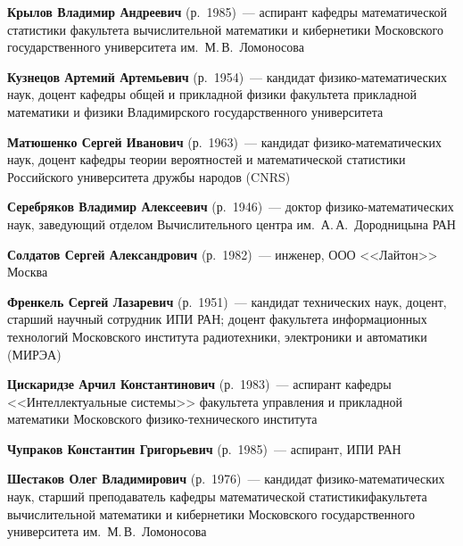 \begin{multicols}{2}
\vspace*{3pt}

\noindent
\textbf{Крылов Владимир Андреевич} (р.\ 1985)~--- аспирант кафедры математической 
статистики факультета вычислительной математики и кибернетики 
Московского государственного университета им.\ М.\,В.~Ломоносова

\columnbreak %


\noindent
\textbf{Кузнецов Артемий Артемьевич} (р.\ 1954)~--- кандидат физико-математических наук, доцент 
кафедры общей и прикладной физики факультета прикладной математики и физики  Владимирского государственного 
университета

\vspace*{3pt}

\noindent
\textbf{Матюшенко Сергей Иванович} (р.\ 1963)~--- кандидат физико-математических наук, 
доцент кафедры тео\-рии вероятностей и математической статистики Российского университета дружбы народов
(CNRS)

\vspace*{3pt}

\noindent
\textbf{Серебряков Владимир Алексеевич} (р.\ 1946)~--- доктор физико-математических
наук, заведующий отделом Вычислительного центра им.\ А.\,А.~Дородницына РАН

\vspace*{3pt}

\noindent
\textbf{Солдатов Сергей Александрович} (р.\ 1982)~--- инженер, ООО <<Лайтон>> Москва

\vspace*{3pt}

\noindent
\textbf{Френкель Сергей Лазаревич} (р.\ 1951)~--- кандидат технических наук, доцент, 
старший научный сотрудник ИПИ РАН; доцент факультета  информационных технологий Московского института 
радиотехники, электроники и автоматики (\mbox{МИРЭА})

\vspace*{3pt}


\noindent
\textbf{Цискаридзе Арчил Константинович} (р.\ 1983)~--- аспирант кафедры
<<Интеллектуальные системы>>
факультета управления и прикладной математики Мос\-ков\-ского
физико-технического института

\vspace*{3pt}


\noindent
\textbf{Чупраков Константин Григорьевич} (р.\ 1985)~--- аспирант, ИПИ РАН


\vspace*{3pt}

\noindent
\textbf{Шестаков Олег Владимирович} (р.\ 1976)~--- 
кандидат физико-математических наук, старший пре\-подава\-тель 
кафедры математической статистики\linebreak факультета вычислительной математики и кибернетики 
Московского государственного университета им.~М.\,В.~Ломоносова

\end{multicols}